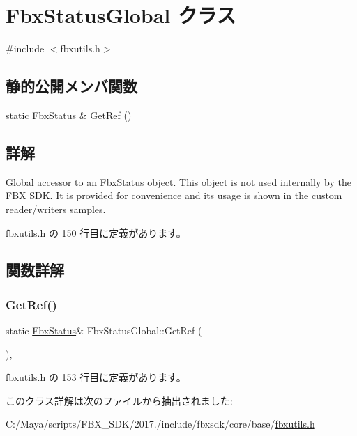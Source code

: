 \hypertarget{class_fbx_status_global}{}\section{Fbx\+Status\+Global クラス}
\label{class_fbx_status_global}


{\ttfamily \#include $<$fbxutils.\+h$>$}

\subsection*{静的公開メンバ関数}
\begin{DoxyCompactItemize}
\item 
static \hyperlink{class_fbx_status}{Fbx\+Status} \& \hyperlink{class_fbx_status_global_a1a20a57303f6db962a715d16d9c849d9}{Get\+Ref} ()
\end{DoxyCompactItemize}


\subsection{詳解}
Global accessor to an \hyperlink{class_fbx_status}{Fbx\+Status} object. This object is not used internally by the F\+BX S\+DK. It is provided for convenience and its usage is shown in the custom reader/writers samples. 

 fbxutils.\+h の 150 行目に定義があります。



\subsection{関数詳解}
\mbox{\label{class_fbx_status_global_a1a20a57303f6db962a715d16d9c849d9}} 
\subsubsection{\texorpdfstring{Get\+Ref()}{GetRef()}}
{\footnotesize\ttfamily static \hyperlink{class_fbx_status}{Fbx\+Status}\& Fbx\+Status\+Global\+::\+Get\+Ref (\begin{DoxyParamCaption}{ }\end{DoxyParamCaption})\hspace{0.3cm}{\ttfamily [inline]}, {\ttfamily [static]}}



 fbxutils.\+h の 153 行目に定義があります。



このクラス詳解は次のファイルから抽出されました\+:\begin{DoxyCompactItemize}
\item 
C\+:/\+Maya/scripts/\+F\+B\+X\+\_\+\+S\+D\+K/2017./include/fbxsdk/core/base/\hyperlink{fbxutils_8h}{fbxutils.\+h}\end{DoxyCompactItemize}
